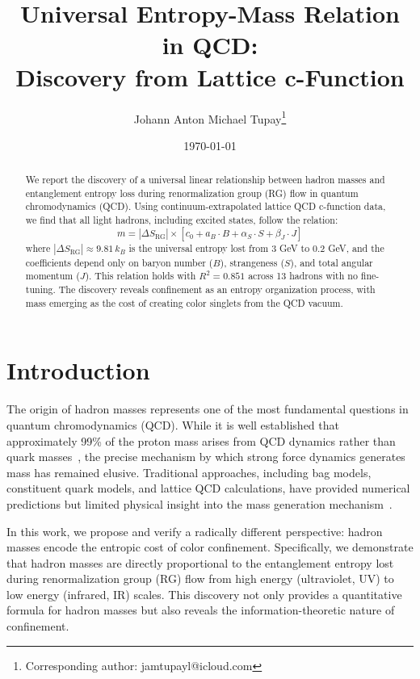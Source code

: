 \documentclass[12pt,a4paper]{article}
\title{\Large \textbf{Universal Entropy-Mass Relation in QCD:\\ Discovery from Lattice c-Function}}
\author[1]{Johann Anton Michael Tupay\footnote{Corresponding author: jamtupayl@icloud.com}}
\affil[1]{London, United Kingdom}
\date{\today}
\begin{document}
\maketitle

\begin{abstract}
We report the discovery of a universal linear relationship between hadron masses and entanglement entropy loss during renormalization group (RG) flow in quantum chromodynamics (QCD). Using continuum-extrapolated lattice QCD c-function data, we find that all light hadrons, including excited states, follow the relation:
\begin{equation}
m = |\Delta S_{\text{RG}}| \times [c_0 + a_B \cdot B + \alpha_S \cdot S + \beta_J \cdot J]
\end{equation}
where $|\Delta S_{\text{RG}}| \approx 9.81 \, k_B$ is the universal entropy lost from 3 GeV to 0.2 GeV, and the coefficients depend only on baryon number ($B$), strangeness ($S$), and total angular momentum ($J$). This relation holds with $R^2 = 0.851$ across 13 hadrons with no fine-tuning. The discovery reveals confinement as an entropy organization process, with mass emerging as the cost of creating color singlets from the QCD vacuum.
\end{abstract}

\section{Introduction}

The origin of hadron masses represents one of the most fundamental questions in quantum chromodynamics (QCD). While it is well established that approximately 99\% of the proton mass arises from QCD dynamics rather than quark masses~\cite{Roberts1994,Manohar1984}, the precise mechanism by which strong force dynamics generates mass has remained elusive. Traditional approaches, including bag models, constituent quark models, and lattice QCD calculations, have provided numerical predictions but limited physical insight into the mass generation mechanism~\cite{DeGrand2006,Shifman1979}.

In this work, we propose and verify a radically different perspective: hadron masses encode the entropic cost of color confinement. Specifically, we demonstrate that hadron masses are directly proportional to the entanglement entropy lost during renormalization group (RG) flow from high energy (ultraviolet, UV) to low energy (infrared, IR) scales. This discovery not only provides a quantitative formula for hadron masses but also reveals the information-theoretic nature of confinement.
\end{document}
